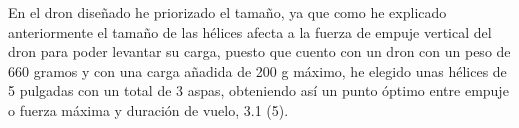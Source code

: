  
 En el dron diseñado he priorizado el tamaño, ya que como he explicado anteriormente el tamaño de las hélices afecta a la fuerza de empuje vertical del dron para poder levantar su carga, puesto que cuento con un dron con un peso de 660 gramos y con una carga añadida de 200 g máximo, he elegido unas hélices de 5 pulgadas con un total de 3 aspas, obteniendo así un punto óptimo entre empuje o fuerza máxima y duración de vuelo, 3.1 (5).

